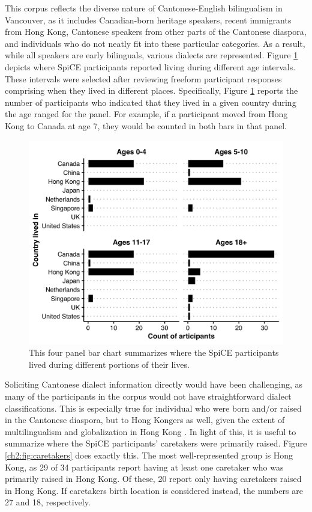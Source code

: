 This corpus reflects the diverse nature of Cantonese-English bilingualism in Vancouver, as it includes Canadian-born heritage speakers, recent immigrants from Hong Kong, Cantonese speakers from other parts of the Cantonese diaspora, and individuals who do not neatly fit into these particular categories. As a result, while all speakers are early bilinguals, various dialects are represented. Figure \ref{ch2:fig:placeslived} depicts where SpiCE participants reported living during different age intervals. These intervals were selected after reviewing freeform participant responses comprising when they lived in different places. Specifically, Figure \ref{ch2:fig:placeslived} reports the number of participants who indicated that they lived in a given country during the age ranged for the panel. For example, if a participant moved from Hong Kong to Canada at age 7, they would be counted in both bars in that panel. 

\begin{figure}[!htbp]
  \begin{center}
  \includegraphics[width=4.9in]{figures/ch2_placeslived_5in.png} 
  \caption{This four panel bar chart summarizes where the SpiCE participants lived during different portions of their lives.}
  \label{ch2:fig:placeslived}
  \end{center}
\end{figure}

Soliciting Cantonese dialect information directly would have been challenging, as many of the participants in the corpus would not have straightforward dialect classifications. This is especially true for individual who were born and/or raised in the Cantonese diaspora, but to Hong Kongers as well, given the extent of multilingualism and globalization in Hong Kong \citep{bolton_2020_societal}. In light of this, it is useful to summarize where the SpiCE participants' caretakers were primarily raised. Figure \ref{ch2:fig:caretakers} does exactly this. The most well-represented group is Hong Kong, as 29 of 34 participants report having at least one caretaker who was primarily raised in Hong Kong. Of these, 20 report only having caretakers raised in Hong Kong. If caretakers birth location is considered instead, the numbers are 27 and 18, respectively. 

